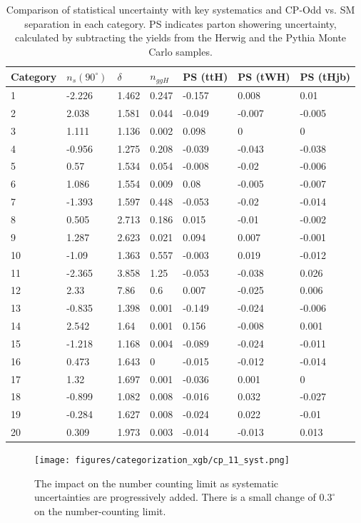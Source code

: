 \begin{table}[ht]
\begin{center}
\begin{tabular}{lllllll}
Category & $n_{s}(90^\circ)$ & $\delta$ & $n_{ggH}$ &PS (ttH)&PS (tWH)&PS (tHjb) \\ \hline 
1&-2.226&1.462&0.247&-0.157&0.008&0.01 \\ 
2&2.038&1.581&0.044&-0.049&-0.007&-0.005 \\ 
3&1.111&1.136&0.002&0.098&0&0 \\ 
4&-0.956&1.275&0.208&-0.039&-0.043&-0.038 \\ 
5&0.57&1.534&0.054&-0.008&-0.02&-0.006 \\ 
6&1.086&1.554&0.009&0.08&-0.005&-0.007 \\ 
7&-1.393&1.597&0.448&-0.053&-0.02&-0.014 \\
8&0.505&2.713&0.186&0.015&-0.01&-0.002 \\ 
9&1.287&2.623&0.021&0.094&0.007&-0.001 \\ 
10&-1.09&1.363&0.557&-0.003&0.019&-0.012 \\
11&-2.365&3.858&1.25&-0.053&-0.038&0.026 \\
12&2.33&7.86&0.6&0.007&-0.025&0.006 \\ \hline 
13&-0.835&1.398&0.001&-0.149&-0.024&-0.006 \\
14&2.542&1.64&0.001&0.156&-0.008&0.001 \\
15&-1.218&1.168&0.004&-0.089&-0.024&-0.011 \\
16&0.473&1.643&0&-0.015&-0.012&-0.014 \\
17&1.32&1.697&0.001&-0.036&0.001&0 \\
18&-0.899&1.082&0.008&-0.016&0.032&-0.027 \\
19&-0.284&1.627&0.008&-0.024&0.022&-0.01 \\ 
20&0.309&1.973&0.003&-0.014&-0.013&0.013 \\ \hline 
\hline
\end{tabular}
\end{center}
\vspace{-0.5cm}
\caption{Comparison of statistical uncertainty with key systematics and CP-Odd vs. SM separation in each category. PS indicates parton showering uncertainty, calculated by subtracting the yields from the Herwig and the Pythia Monte Carlo samples.}
\label{tab:systs}
\end{table}

\begin{figure}
  \centering
        \texttt{[image: figures/categorization\_xgb/cp\_11\_syst.png]}
  \caption{The impact on the number counting limit as systematic uncertainties are progressively added. There is a small change of $0.3^\circ$ on the number-counting limit. }
  \label{fig:ncrej_syst}
\end{figure}


